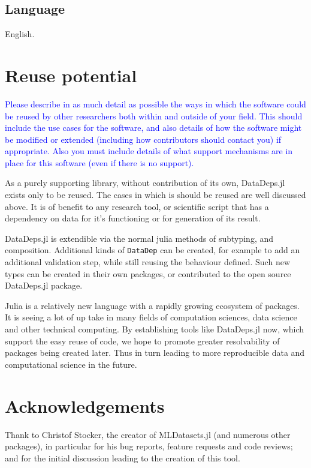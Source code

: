 \documentclass{jors}
\begin{document}
\subsection{Language}
English.

\section{Reuse potential}
\textcolor{blue}{Please describe in as much detail as possible the ways in which the software could be reused by other researchers both within and outside of your field. This should include the use cases for the software, and also details of how the software might be modified or extended (including how contributors should contact you) if appropriate. Also you must include details of what support mechanisms are in place for this software (even if there is no support).}

As a purely supporting library, without contribution of its own, DataDeps.jl exists only to be reused.
The cases in which is should be reused are well discussed above.
It is of benefit to any research tool, or scientific script that has a dependency on data for it's functioning or for generation of its result.


DataDeps.jl is extendible via the normal julia methods of subtyping, and composition.
Additional kinds of \texttt{DataDep} can be created, for example to add an additional validation step,
while still reusing the behaviour defined.
Such new types can be created in their own packages, or contributed to the open source DataDeps.jl package.


Julia is a relatively new language with a rapidly growing ecosystem of packages.
It is seeing a lot of up take in many fields of computation sciences, data science and other technical computing.
By establishing tools like DataDeps.jl now, which support the easy reuse of code,
we hope to promote greater resolvability of packages being created later.
Thus in turn leading to more reproducible data and computational science in the future.

\section*{Acknowledgements}
Thank to Christof Stocker, the creator of MLDatasets.jl (and numerous other packages), in particular for his bug reports, feature requests and code reviews; and for the initial discussion leading to the creation of this tool.
\end{document}
